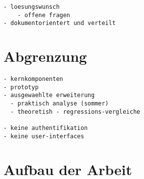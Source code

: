 \begin{verbatim}
- loesungswunsch
    - offene fragen
- dokumentorientert und verteilt
\end{verbatim}

\section{Abgrenzung}

\begin{verbatim}
- kernkomponenten
- prototyp
- ausgewaehlte erweiterung
  - praktisch analyse (sommer)
  - theoretish - regressions-vergleiche

- keine authentifikation
- keine user-interfaces

\end{verbatim}

\section{Aufbau der Arbeit}


